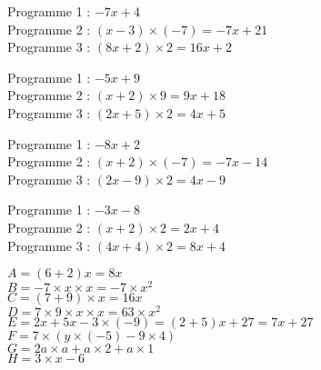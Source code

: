 \documentclass[a4paper,11pt,fleqn]{article}
\begin{document}
\pagestyle{empty}


\renewcommand{\headrulewidth}{1pt}

\renewcommand{\footrulewidth}{1pt}
\fancyfoot[C]{} 
\fancyfoot[L]{}



\setcounter{exo}{0}
\vfill
\begin{correction}
\begin{multicols}{2}
%
%


Programme 1 : $-7 x +4$\\
Programme 2 : $(x -3)\times (-7)= -7  x  +21 $\\
Programme 3 : $( 8 x +2 )\times 2= 16 x +2$


Programme 1 : $-5 x +9$\\
Programme 2 : $(x +2)\times 9= 9  x  +18 $\\
Programme 3 : $( 2 x +5 )\times 2= 4 x +5$


Programme 1 : $-8 x +2$\\
Programme 2 : $(x +2)\times (-7)= -7  x  -14 $\\
Programme 3 : $( 2 x -9 )\times 2= 4 x -9$


Programme 1 : $-3 x -8$\\
Programme 2 : $(x +2)\times 2= 2  x  +4 $\\
Programme 3 : $( 4 x +4 )\times 2= 8 x +4$



\begin{multicols}{2}
$A=(6  +2) x=8 x$\\
$B=-7 \times x\times x=-7 \times x^2$\\
$C=(7 +9) \times x=16  x$\\
$D=7\times 9\times x\times x=63\times x^2$\\
$E= 2  x +5 x -3\times (-9) = (2  +5) x +27 = 7 x +27 $\\
$F=7 \times (y\times (-5) -9 \times 4)$\\
$G=2 a\times  a+a\times 2+a\times 1$\\
$H= 3\times x -6$
\end{multicols}


\end{multicols}
\end{correction}
\end{document}
